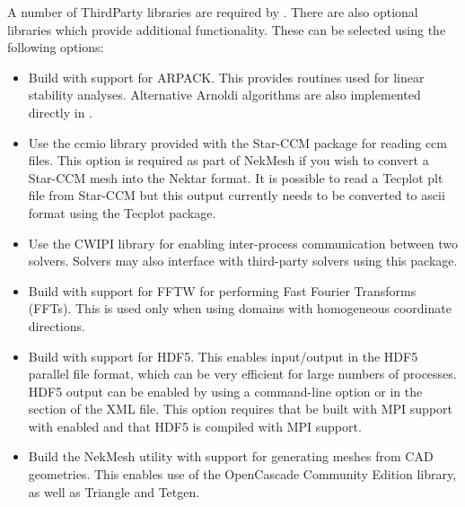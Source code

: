A number of ThirdParty libraries are required by \nekpp. There are
also optional libraries which provide additional functionality. These
can be selected using the following options:
\begin{itemize}
    \item {}

    Build \nekpp with support for ARPACK. This provides routines used for
    linear stability analyses. Alternative Arnoldi algorithms are also
    implemented directly in \nekpp.

    \item {}

    Use the ccmio library provided with the Star-CCM package for
    reading ccm files. This option is required as part of NekMesh
    if you wish to convert a Star-CCM mesh into the Nektar format. It
    is possible to read a Tecplot plt file from Star-CCM but this
    output currently needs to be converted to ascii format using the
    Tecplot package.

    \item {}

    Use the CWIPI library for enabling inter-process communication between two solvers. Solvers may also interface with third-party solvers using this package.

    \item {}

    Build \nekpp with support for FFTW for performing Fast Fourier Transforms
    (FFTs). This is used only when using domains with homogeneous coordinate
    directions.

    \item {}

    Build \nekpp with support for HDF5. This enables input/output in the HDF5
    parallel file format, which can be very efficient for large numbers of
    processes. HDF5 output can be enabled by using a command-line option or
    in the  section of the XML file. This option requires
    that \nekpp be built with MPI support with  enabled
    and that HDF5 is compiled with MPI support.

    \item {}

    Build the NekMesh utility with support for generating meshes from CAD geometries. This enables use of the OpenCascade Community Edition library, as well as Triangle and Tetgen.


\end{itemize}

